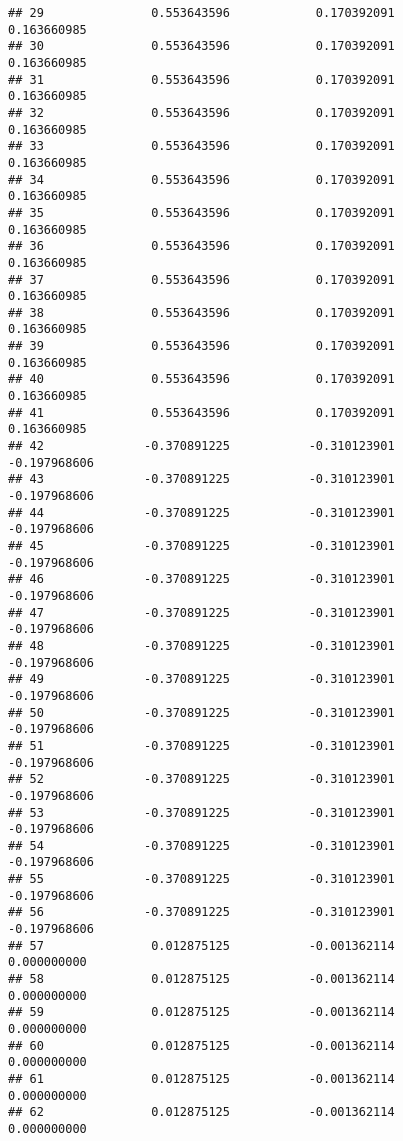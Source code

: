 \documentclass[]{article}
\begin{document}
\begin{verbatim}
## 29               0.553643596            0.170392091            0.163660985
## 30               0.553643596            0.170392091            0.163660985
## 31               0.553643596            0.170392091            0.163660985
## 32               0.553643596            0.170392091            0.163660985
## 33               0.553643596            0.170392091            0.163660985
## 34               0.553643596            0.170392091            0.163660985
## 35               0.553643596            0.170392091            0.163660985
## 36               0.553643596            0.170392091            0.163660985
## 37               0.553643596            0.170392091            0.163660985
## 38               0.553643596            0.170392091            0.163660985
## 39               0.553643596            0.170392091            0.163660985
## 40               0.553643596            0.170392091            0.163660985
## 41               0.553643596            0.170392091            0.163660985
## 42              -0.370891225           -0.310123901           -0.197968606
## 43              -0.370891225           -0.310123901           -0.197968606
## 44              -0.370891225           -0.310123901           -0.197968606
## 45              -0.370891225           -0.310123901           -0.197968606
## 46              -0.370891225           -0.310123901           -0.197968606
## 47              -0.370891225           -0.310123901           -0.197968606
## 48              -0.370891225           -0.310123901           -0.197968606
## 49              -0.370891225           -0.310123901           -0.197968606
## 50              -0.370891225           -0.310123901           -0.197968606
## 51              -0.370891225           -0.310123901           -0.197968606
## 52              -0.370891225           -0.310123901           -0.197968606
## 53              -0.370891225           -0.310123901           -0.197968606
## 54              -0.370891225           -0.310123901           -0.197968606
## 55              -0.370891225           -0.310123901           -0.197968606
## 56              -0.370891225           -0.310123901           -0.197968606
## 57               0.012875125           -0.001362114            0.000000000
## 58               0.012875125           -0.001362114            0.000000000
## 59               0.012875125           -0.001362114            0.000000000
## 60               0.012875125           -0.001362114            0.000000000
## 61               0.012875125           -0.001362114            0.000000000
## 62               0.012875125           -0.001362114            0.000000000

\end{verbatim}
\end{document}
